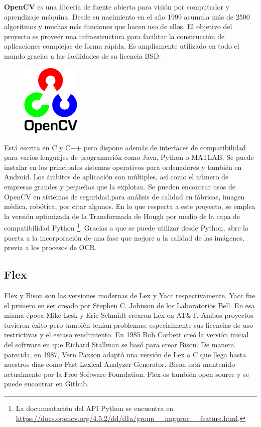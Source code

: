 \textbf{OpenCV} \cite{opencvTeam_oficialSite_main} es una librería de fuente abierta para visión por computador y aprendizaje máquina. Desde su nacimiento en el año 1999 acumula más de 2500 algoritmos y muchas más funciones que hacen uso de ellos. El objetivo del proyecto es proveer una infraestructura para facilitar la construcción de aplicaciones complejas de forma rápida. Es ampliamente utilizado en todo el mundo gracias a las facilidades de su licencia BSD. 

\begin{figure}
    \centering
    \includegraphics[width=0.25\textwidth]{imaxes/e-fundamentos-tecnologicos/logo-opencv.png}
\end{figure}

Está escrita en C y C++ pero dispone además de interfaces de compatibilidad para varios lenguajes de programación como Java, Python o MATLAB. Se puede instalar en los principales sistemas operativos para ordenadores y también en Android. Los ámbitos de aplicación son múltiples, así como el número de empresas grandes y pequeñas que la explotan. Se pueden encontrar usos de OpenCV en sistemas de seguridad,para análisis de calidad en fábricas, imagen médica, robótica, por citar algunos. En lo que respecta a este proyecto, se emplea la versión optimizada de la Transformada de Hough por medio de la capa de compatibilidad Python \footnote{La documentación del API Python se encuentra en \url{https://docs.opencv.org/4.5.2/dd/d1a/group__imgproc__feature.html}.}. Gracias a que se puede utilizar desde Python, abre la puerta a la incorporación de una fase que mejore a la calidad de las imágenes, previa a los procesos de OCR.

\subsection{Flex}
\label{subsec:flex}

Flex y Bison son las versiones modernas de Lex y Yacc respectivamente. Yacc fue el primero en ser creado por Stephen C. Johnson de los Laboratorios Bell. En esa misma época Mike Lesk y Eric Schmidt crearon Lex en AT\&T. Ambos proyectos tuvieron éxito pero también tenían problemas: especialmente sus licencias de uso restrictivas y el escaso rendimiento.
En 1985 Bob Corbett creó la versión inicial del software en que Richard Stallman se basó para crear Bison. De manera parecida, en 1987, Vern Paxson adaptó una versión de Lex a C que llega hasta nuestros días como Fast Lexical Analyzer Generator. Bison está mantenido actualmente por la Free Software Foundation. Flex es también open source y se puede encontrar en Github.

